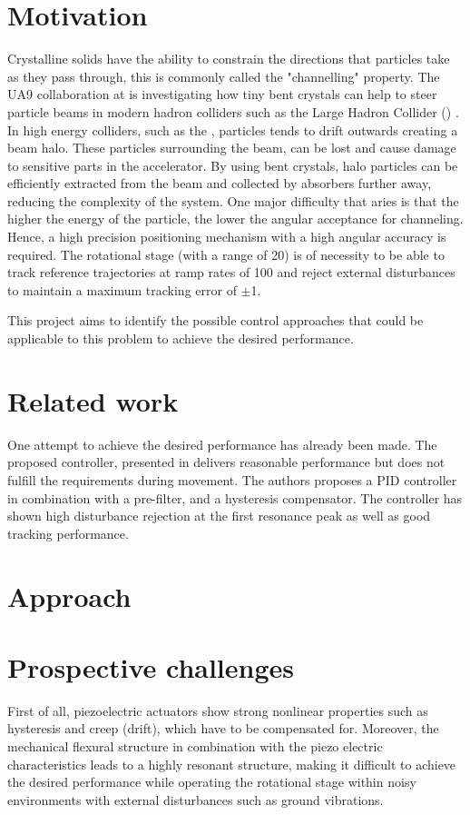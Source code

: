 \section{Motivation}
Crystalline solids have the ability to constrain the directions that particles take as they pass through, this is commonly called the "channelling" property. The UA9 collaboration at \abbrCERN is investigating how tiny bent crystals can help to steer particle beams in modern hadron colliders such as the Large Hadron Collider (\abbrLHC) \citep{WebsiteUA9:2016}. In high energy colliders, such as the \abbrLHC, particles tends to drift outwards creating a beam halo. These particles surrounding the beam, can be lost and cause damage to sensitive parts in the accelerator. By using bent crystals, halo particles can be efficiently extracted from the beam and collected by absorbers further away, reducing the complexity of the system. One major difficulty that aries is that the higher the energy of the particle, the lower the angular acceptance for channeling. Hence, a high precision positioning mechanism with a high angular accuracy is required. The rotational stage (with a range of \unit{20}{\milli\rad}) is of necessity to be able to track reference trajectories at ramp rates of \unit{100}{\micro\radianpersecond} and reject external disturbances to maintain a maximum tracking error of $\pm$\unit{1}{\micro\rad}.

This project aims to identify the possible control approaches that could be applicable to this problem to achieve the desired performance.

\section{Related work}
One attempt to achieve the desired performance has already been made. The proposed controller, presented in \citep{ButcherController:2015} delivers reasonable performance but does not fulfill the requirements during movement. The authors proposes a PID controller in combination with a pre-filter, and a hysteresis compensator. The controller has shown high disturbance rejection at the first resonance peak as well as good tracking performance.

\section{Approach}

\section{Prospective challenges}
First of all, piezoelectric  actuators show strong nonlinear properties such as hysteresis and creep (drift), which have to be compensated for. Moreover, the mechanical flexural structure in combination with the piezo electric characteristics leads to a highly resonant structure, making it difficult to achieve the desired performance while operating the rotational stage within noisy environments with external disturbances such as ground vibrations.

